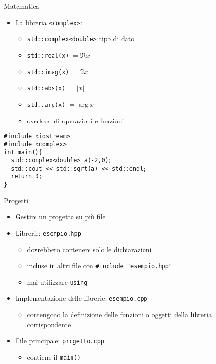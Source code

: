 \begin{frame}[fragile]{Matematica}
  \vfill
  \begin{itemize}
    \item La libreria \lstinline$<complex>$:
    \begin{itemize}
      \item \lstinline$std::complex<double>$ tipo di dato
      \item \lstinline$std::real(x)$ \( = \Re{x}\)
      \item \lstinline$std::imag(x)$ \( = \Im{x}\)
      \item \lstinline$std::abs(x)$ \( = |x|\)
      \item \lstinline$std::arg(x)$ \( = \arg{x}\)
      \item overload di operazioni e funzioni
    \end{itemize}
  \end{itemize}
  \vfill
  \begin{lstlisting}
#include <iostream>
#include <complex>
int main(){
  std::complex<double> a(-2,0);
  std::cout << std::sqrt(a) << std::endl;
  return 0;
}
  \end{lstlisting}
  \vfill
\end{frame}

\begin{frame}[fragile]{Progetti}
  \vfill
  \begin{itemize}
    \item Gestire un progetto su più file
    \vfill
    \item Librerie: \lstinline$esempio.hpp$
    \begin{itemize}
      \item dovrebbero contenere solo le dichiarazioni
      \item incluse in altri file con \lstinline$#include "esempio.hpp"$
      \item \alert{mai} utilizzare \lstinline$using$
    \end{itemize}
    \vfill
    \item Implementazione delle librerie: \lstinline$esempio.cpp$
    \begin{itemize}
      \item contengono la definizione delle funzioni o oggetti della libreria corrispondente
    \end{itemize}
    \vfill
    \item File principale: \lstinline$progetto.cpp$
    \begin{itemize}
      \item contiene il \lstinline$main()$
    \end{itemize}
  \end{itemize}
  \vfill
\end{frame}

